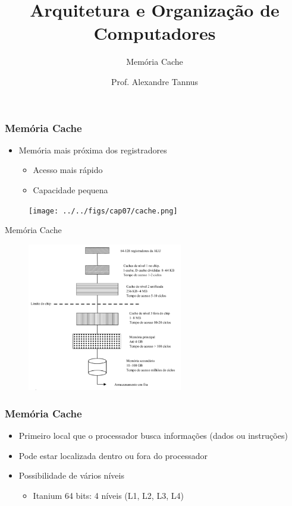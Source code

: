\documentclass[aspectratio=169,
				xcolor=table]{beamer}
\title[]{Arquitetura e Organização de Computadores}
\subtitle[]{Memória Cache}
\author[]{Prof. Alexandre Tannus}
\date{}
\begin{document}
	\begin{frame}
		\titlepage
	\end{frame}

	\begin{frame}
		\tableofcontents		
	\end{frame}	
	

	\begin{frame}
		\frametitle{Memória Cache}
		\begin{itemize}
			\item Memória mais próxima dos registradores
			\begin{itemize}
				\item Acesso mais rápido
				\item Capacidade pequena
			\end{itemize}
		\end{itemize}
		\begin{figure}[hbtp]
			\centering
			\texttt{[image: ../../figs/cap07/cache.png]}
		\end{figure}		
	\end{frame}

	\begin{frame}{Memória Cache}

		\begin{figure}[hbtp]
			\centering
			\includegraphics[height=6.5cm, keepaspectratio]{../../figs/cap07/hierarquia.png}
		\end{figure}		
	\end{frame}
	
	\begin{frame}
		\frametitle{Memória Cache}
		\begin{itemize}
			\item Primeiro local que o processador busca informações (dados ou instruções)
			\vspace{1em}
			\item Pode estar localizada dentro ou fora do processador
			\vspace{1em}
			\item Possibilidade de vários níveis
			\begin{itemize}
				\item Itanium 64 bits: 4 níveis (L1, L2, L3, L4)
			\end{itemize}

		\end{itemize}
	\end{frame}
\end{document}
